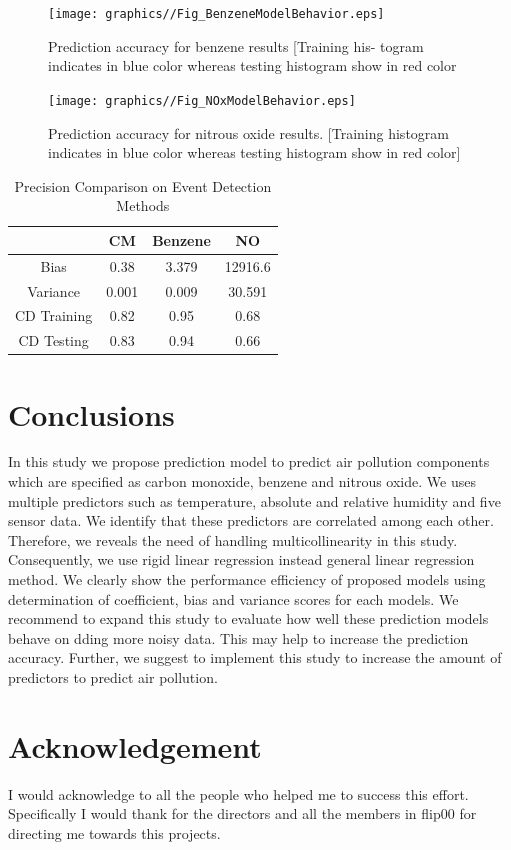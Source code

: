\begin{figure}
  \centering
 \texttt{[image: graphics//Fig\_BenzeneModelBehavior.eps]}
  \caption{Prediction accuracy for benzene results [Training his-
  togram indicates in blue color whereas testing histogram show in
  red color} \label{Fig_Predbenzene}
\end{figure}

\begin{figure}
  \centering
 \texttt{[image: graphics//Fig\_NOxModelBehavior.eps]}
  \caption{Prediction accuracy for nitrous oxide results. [Training
  histogram indicates in blue color whereas testing histogram show
  in red color]} \label{Fig_Prednitrousoxide}
\end{figure}

\begin{table}  \centering
  \caption{Precision Comparison on Event Detection Methods}
  \label{tbl:overall-experiments}
  \begin{tabular}{cccc}
\toprule
    & CM & Benzene &NO \\
\midrule
Bias & 0.38 & 3.379 & 12916.6 \\
Variance & 0.001 & 0.009 & 30.591 \\
CD Training & 0.82 & 0.95 & 0.68 \\
CD Testing & 0.83 & 0.94 & 0.66 \\
\bottomrule
\end{tabular}
\end{table}


\section{Conclusions} \label{sec-conclusions}

In this study we propose prediction model to predict air pollution components which are specified as carbon monoxide, benzene and nitrous oxide. We uses multiple predictors such as temperature, absolute and relative humidity and five sensor data.
We identify that these predictors are correlated among each other.
Therefore, we reveals the need of handling multicollinearity in this study.
Consequently, we use rigid linear regression instead general linear regression method.
We clearly show the performance efficiency of proposed 
models using determination of coefficient, bias and variance scores for each models.
We recommend to expand this study to evaluate how well these prediction models behave on dding more noisy data.
This may help to increase the prediction accuracy.
Further, we suggest to implement this study to increase the amount of predictors to predict air pollution.

\section*{Acknowledgement}
I would acknowledge to all the people who helped me to success this effort. Specifically I would thank for the directors and all the members in flip00 for directing me towards this projects.


